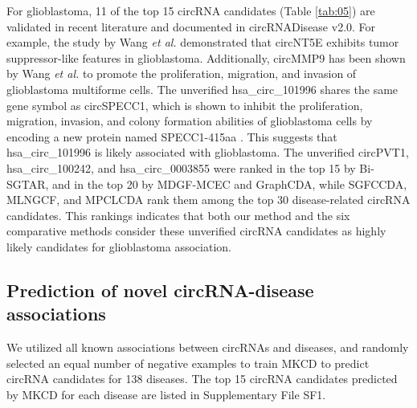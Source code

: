 \documentclass[journal,twoside,web]{ieeecolor}
\begin{document}
For glioblastoma, 11 of the top 15 circRNA candidates (Table \ref{tab:05}) are validated in recent literature and documented in circRNADisease v2.0. For example, the study by Wang {\it et al.} \cite{wang2018circnt5e} demonstrated that circNT5E exhibits tumor suppressor-like features in glioblastoma. Additionally, circMMP9 has been shown by Wang {\it et al.} \cite{wang2018eif4a3} to promote the proliferation, migration, and invasion of glioblastoma multiforme cells. 
The unverified hsa\_circ\_101996 shares the same gene symbol as circSPECC1, which is shown to inhibit the proliferation, migration, invasion, and colony formation abilities of glioblastoma cells by encoding a new protein named SPECC1-415aa \cite{wei2024novel}. This suggests that hsa\_circ\_101996 is likely associated with glioblastoma. The unverified circPVT1, hsa\_circ\_100242, and hsa\_circ\_0003855 were ranked in the top 15 by Bi-SGTAR, and in the top 20 by MDGF-MCEC and GraphCDA, while SGFCCDA, MLNGCF, and MPCLCDA rank them among the top 30 disease-related circRNA candidates. This rankings indicates that both our method and the six comparative methods consider these unverified circRNA candidates as highly likely candidates for glioblastoma association.
 

\subsection{Prediction of novel circRNA-disease associations}
We utilized all known associations between circRNAs and diseases, and randomly selected an equal number of negative examples to train MKCD to predict circRNA candidates for 138 diseases. The top 15 circRNA candidates predicted by MKCD for each disease are listed in Supplementary File SF1.
\end{document}
